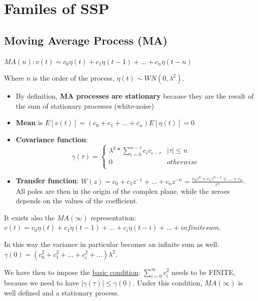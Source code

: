 \documentclass[10pt,a4paper]{article}
\begin{document}
\section{Familes of SSP}
\subsection{Moving Average Process (MA)}
\center 
$MA(n) : v(t) = c_0 \eta(t) + c_1 \eta(t-1) + ... + c_n \eta(t-n)$
\\
\vspace{1em}
\raggedright
Where $n$ is the order of the process, $\eta(t) \sim WN(0,\lambda^2)$. \\
\begin{itemize}
	\item By definition, \textbf{MA processes are stationary} because they are the result of the sum of stationary processes (white-noise)
	\item \textbf{Mean} is $E[v(t)]=(c_0 + c_1 + ... + c_n)E[\eta(t)]=0$
	\item \textbf{Covariance function}:
	\begin{equation}
  		\gamma(\tau) =
    		\begin{cases}
      			\lambda^2 * \sum_{i=0}^{n - \tau} c_ic_{i-\tau} & |\tau| \leq n\\
      			0 & otherwise\\
    \end{cases}  
    \end{equation} 

	\item \textbf{Transfer function}: $W(z)=c_0+c_1z^{-1}+...+c_nz^{-n}=\frac{c_0z^n+c_1z^{n-1}+...+c_n}{z^n}$. \\
	All poles are then in the origin of the complex plane, while the zeroes depends on the values of the coefficient. 
\end{itemize}
\pagebreak
It exists also the $MA(\infty)$ representation:
\center $v(t) = c_0\eta(t)+c_1\eta(t-1)+...+c_i\eta(t-i)+... + infinite sum$. 
\\ \raggedright \vspace{0.5em}
In this way the variance in particular becomes an infinite sum as well:
\center $\gamma(0) = (c_0^2+c_1^2+... +c_i^2 + ...) \lambda^2$. 
\\ \raggedright \vspace{0.5em}
We have then to impose the \uline{basic condition}: $\sum_{i=0}^{\infty} c_i^2$ needs to be FINITE, because we need to have $|\gamma(\tau)| \leq \gamma(0)$. Under this condition, $MA(\infty)$ is well defined and a stationary process.
\end{document}
